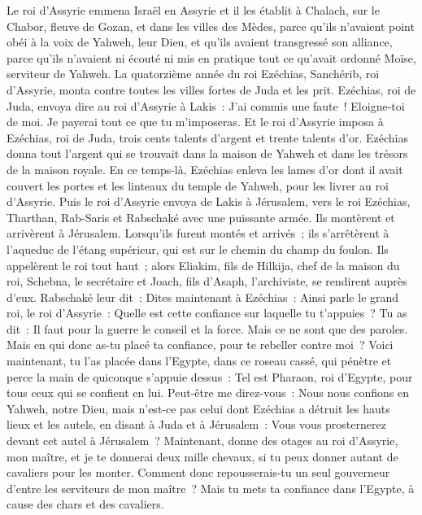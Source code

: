 \begin{multicols}{2}
Le roi d'Assyrie emmena Israël en Assyrie et il les établit à Chalach, sur le Chabor, fleuve de Gozan, et dans les villes des Mèdes,
parce qu'ils n'avaient point obéi à la voix de Yahweh, leur Dieu, et qu'ils avaient transgressé son alliance, parce qu'ils n'avaient ni écouté ni mis en pratique tout ce qu'avait ordonné Moïse, serviteur de Yahweh.
La quatorzième année du roi Ezéchias, Sanchérib, roi d'Assyrie, monta contre toutes les villes fortes de Juda et les prit.
Ezéchias, roi de Juda, envoya dire au roi d'Assyrie à Lakis~: J'ai commis une faute~! Eloigne-toi de moi. Je payerai tout ce que tu m'imposeras. Et le roi d'Assyrie imposa à Ezéchias, roi de Juda, trois cents talents d'argent et trente talents d'or.
Ezéchias donna tout l'argent qui se trouvait dans la maison de Yahweh et dans les trésors de la maison royale.
En ce temps-là, Ezéchias enleva les lames d'or dont il avait couvert les portes et les linteaux du temple de Yahweh, pour les livrer au roi d'Assyrie.
Puis le roi d'Assyrie envoya de Lakis à Jérusalem, vers le roi Ezéchias, Tharthan, Rab-Saris et Rabschaké avec une puissante armée. Ils montèrent et arrivèrent à Jérusalem. Lorsqu'ils furent montés et arrivés~; ils s'arrêtèrent à l'aqueduc de l'étang supérieur, qui est sur le chemin du champ du foulon.
Ils appelèrent le roi tout haut~; alors Eliakim, fils de Hilkija, chef de la maison du roi, Schebna, le secrétaire et Joach, fils d'Asaph, l'archiviste, se rendirent auprès d'eux.
Rabschaké leur dit~: Dites maintenant à Ezéchias~: Ainsi parle le grand roi, le roi d'Assyrie~: Quelle est cette confiance sur laquelle tu t'appuies~?
Tu as dit~: Il faut pour la guerre le conseil et la force. Mais ce ne sont que des paroles. Mais en qui donc as-tu placé ta confiance, pour te rebeller contre moi~?
Voici maintenant, tu l'as placée dans l'Egypte, dans ce roseau cassé, qui pénètre et perce la main de quiconque s'appuie dessus~: Tel est Pharaon, roi d'Egypte, pour tous ceux qui se confient en lui.
Peut-être me direz-vous~: Nous nous confions en Yahweh, notre Dieu, mais n'est-ce pas celui dont Ezéchias a détruit les hauts lieux et les autels, en disant à Juda et à Jérusalem~: Vous vous prosternerez devant cet autel à Jérusalem~?
Maintenant, donne des otages au roi d'Assyrie, mon maître, et je te donnerai deux mille chevaux, si tu peux donner autant de cavaliers pour les monter.
Comment donc repousserais-tu un seul gouverneur d'entre les serviteurs de mon maître~? Mais tu mets ta confiance dans l'Egypte, à cause des chars et des cavaliers.

\end{multicols}

